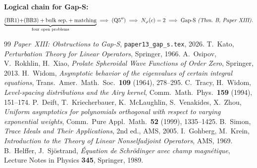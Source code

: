 \documentclass[12pt,a4paper]{amsart}
\theoremstyle{definition}
\theoremstyle{remark}
\begin{document}
\medskip\noindent
\textbf{Logical chain for Gap-S:}
\[
 \underbrace{\text{(BR1)+(BR3)}+\text{bulk sep.}+\text{matching}}_{
 \text{four open problems}}
 \;\Longrightarrow\;
 \text{(Q5$''$)}
 \;\Longrightarrow\;
 N_\varphi(c)=2
 \;\Longrightarrow\;
 \text{Gap-S \emph{(Thm.~B, Paper~XIII).}}
\]

\begin{thebibliography}{99}
 \textit{Paper~XIII: Obstructions to Gap-S},
 \texttt{paper13\_gap\_s.tex}, 2026.
 T.~Kato, \textit{Perturbation Theory for Linear Operators},
 Springer, 1966.
 A.~Osipov, V.~Rokhlin, H.~Xiao,
 \textit{Prolate Spheroidal Wave Functions of Order Zero}, Springer, 2013.
 H.~Widom,
 \textit{Asymptotic behavior of the eigenvalues of certain integral equations},
 Trans.\ Amer.\ Math.\ Soc.\ \textbf{109} (1964), 278--295.
 C.~Tracy, H.~Widom,
 \textit{Level-spacing distributions and the Airy kernel},
 Comm.\ Math.\ Phys.\ \textbf{159} (1994), 151--174.
 P.~Deift, T.~Kriecherbauer, K.~McLaughlin,
 S.~Venakides, X.~Zhou,
 \textit{Uniform asymptotics for polynomials orthogonal with respect
 to varying exponential weights},
 Comm.\ Pure Appl.\ Math.\ \textbf{52} (1999), 1335--1425.
 B.~Simon,
 \textit{Trace Ideals and Their Applications}, 2nd ed., AMS, 2005.
 I.~Gohberg, M.~Krein,
 \textit{Introduction to the Theory of Linear Nonselfadjoint Operators},
 AMS, 1969.
 B.~Helffer, J.~Sj\"ostrand,
 \textit{\'Equation de Schr\"odinger avec champ magn\'etique},
 Lecture Notes in Physics \textbf{345}, Springer, 1989.
\end{thebibliography}
\end{document}
